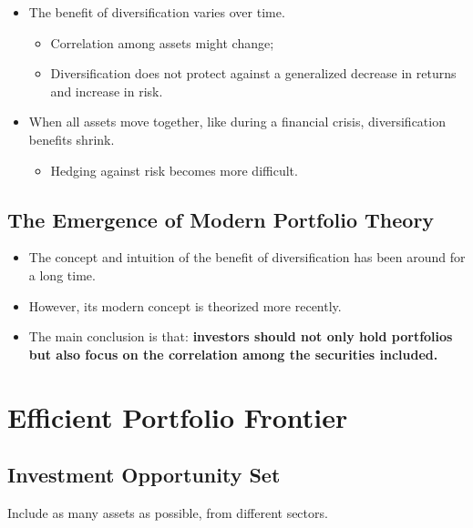 \documentclass[11pt,a4paper]{report}
\begin{document}
\begin{itemize}
    \item The benefit of diversification varies over time.
    \begin{itemize}
        \item Correlation among assets might change;
        \item Diversification does not protect against a generalized decrease in returns and increase in risk.
    \end{itemize}
    \item When all assets move together, like during a financial crisis, diversification benefits shrink.
    \begin{itemize}
        \item Hedging against risk becomes more difficult.
    \end{itemize}
\end{itemize}

\subsection{The Emergence of Modern Portfolio Theory}
\begin{itemize}
    \item The concept and intuition of the benefit of diversification has been around for a long time.
    \item However, its modern concept is theorized more recently.
    \item The main conclusion is that: \textbf{investors should not only hold portfolios but also focus on the correlation among the securities included.}
\end{itemize}

\section{Efficient Portfolio Frontier}
\subsection{Investment Opportunity Set}
Include as many assets as possible, from different sectors.
\end{document}
